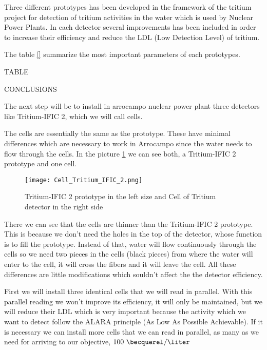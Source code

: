 Three different prototypes has been developed in the framework of the tritium project for detection of tritium activities in the water which is used by Nuclear Power Plants. In each detector several improvements has been included in order to increase their efficiency and reduce the LDL (Low Detection Level) of tritium. 

The table \ref{} summarize the most important parameters of each prototypes.

TABLE

CONCLUSIONS

The next step will be to install in arrocampo nuclear power plant three detectors like Tritium-IFIC 2, which we will call cells. 

The cells are essentially the same as the prototype. These have minimal differences which are necessary to work in Arrocampo since the water needs to flow through the cells. In the picture \ref{fig:Cell_prototype} we can see both, a Tritium-IFIC 2  prototype and one cell. 

\begin{figure}[htb]
\centering
{
\texttt{[image: Cell\_Tritium\_IFIC\_2.png]} 
}
\caption{Tritium-IFIC 2 prototype in the left size and Cell of Tritium detector in the right side \label{fig:Cell_prototype}}
\end{figure} 


There we can see that the cells are thinner than the Tritium-IFIC 2 prototype. This is because we don't need the holes in the top of the detector, whose function is to fill the prototype. Instead of that, water will flow continuously through the cells so we need two pieces in the cells (black pieces) from where the water will enter to the cell, it will cross the fibers and it will leave the cell. All these differences are little modifications which souldn't affect the the detector efficiency.

First we will install three identical cells that we will read in parallel. With this parallel reading we won't improve its efficiency, it will only be maintained, but we will reduce their LDL which is very important because the activity which we want to detect follow the ALARA principle (As Low As Possible Achievable). If it is necessary we can install more cells that we can read in parallel, as many as we need for arriving to our objective, $100~\becquerel/\liter$